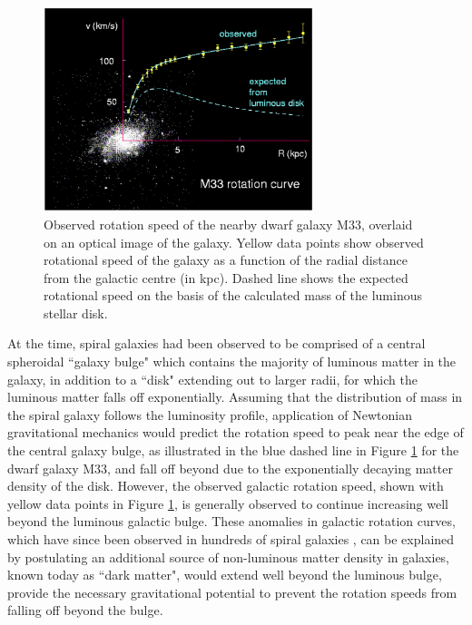 \begin{figure}[H]
	\centering
	\includegraphics[width=0.7\textwidth]{Figures/1/m33_rotation.pdf}
	\caption[]{Observed rotation speed of the nearby dwarf galaxy M33, overlaid on an optical image of the galaxy. Yellow data points show observed rotational speed of the galaxy as a function of the radial distance from the galactic centre (in kpc). Dashed line shows the expected rotational speed on the basis of the calculated mass of the luminous stellar disk. }
	\label{fig:m33_rotation}
\end{figure}

At the time, spiral galaxies had been observed to be comprised of a central spheroidal ``galaxy bulge" which contains the majority of luminous matter in the galaxy, in addition to a ``disk" extending out to larger radii, for which the luminous matter falls off exponentially. Assuming that the distribution of mass in the spiral galaxy follows the luminosity profile, application of Newtonian gravitational mechanics would predict the rotation speed to peak near the edge of the central galaxy bulge, as illustrated in the blue dashed line in Figure \ref{fig:m33_rotation} for the dwarf galaxy M33, and fall off beyond due to the exponentially decaying matter density of the disk. However, the observed galactic rotation speed, shown with yellow data points in Figure \ref{fig:m33_rotation}, is generally observed to continue increasing well beyond the luminous galactic bulge. These anomalies in galactic rotation curves, which have since been observed in hundreds of spiral galaxies \cite{rotn_curves_1995}, can be explained by postulating an additional source of non-luminous matter density in galaxies, known today as ``dark matter", would extend well beyond the luminous bulge, provide the necessary gravitational potential to prevent the rotation speeds from falling off beyond the bulge.

